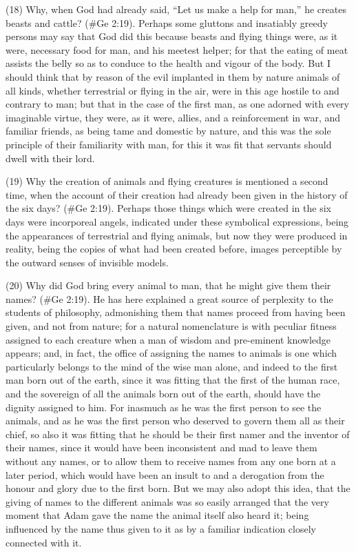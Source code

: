 (18) Why, when God had already said, ``Let us make a help for man,'' he creates beasts and
cattle? (\#Ge 2:19). Perhaps some gluttons and insatiably greedy persons may say that God
did this because beasts and flying things were, as it were, necessary food for man, and his
meetest helper; for that the eating of meat assists the belly so as to conduce to the health and
vigour of the body. But I should think that by reason of the evil implanted in them by nature animals
of all kinds, whether terrestrial or flying in the air, were in this age hostile to and contrary to man;
but that in the case of the first man, as one adorned with every imaginable virtue, they were, as it
were, allies, and a reinforcement in war, and familiar friends, as being tame and domestic by
nature, and this was the sole principle of their familiarity with man, for this it was fit that servants
should dwell with their lord.

(19) Why the creation of animals and flying creatures is mentioned a second time, when the
account of their creation had already been given in the history of the six days? (\#Ge 2:19).
Perhaps those things which were created in the six days were incorporeal angels, indicated under
these symbolical expressions, being the appearances of terrestrial and flying animals, but now they
were produced in reality, being the copies of what had been created before, images perceptible by
the outward senses of invisible models.

(20) Why did God bring every animal to man, that he might give them their names? (\#Ge 2:19).
He has here explained a great source of perplexity to the students of philosophy, admonishing
them that names proceed from having been given, and not from nature; for a natural nomenclature
is with peculiar fitness assigned to each creature when a man of wisdom and pre-eminent
knowledge appears; and, in fact, the office of assigning the names to animals is one which
particularly belongs to the mind of the wise man alone, and indeed to the first man born out of the
earth, since it was fitting that the first of the human race, and the sovereign of all the animals born
out of the earth, should have the dignity assigned to him. For inasmuch as he was the first person
to see the animals, and as he was the first person who deserved to govern them all as their chief,
so also it was fitting that he should be their first namer and the inventor of their names, since it
would have been inconsistent and mad to leave them without any names, or to allow them to
receive names from any one born at a later period, which would have been an insult to and a
derogation from the honour and glory due to the first born. But we may also adopt this idea, that the
giving of names to the different animals was so easily arranged that the very moment that Adam
gave the name the animal itself also heard it; being influenced by the name thus given to it as by a
familiar indication closely connected with it.

